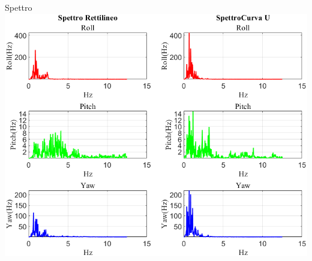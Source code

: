 \documentclass[beamer]{standalone}
\begin{document}
	\begin{frame}{{Spettro}}
		\centering\includegraphics[height=.8\textheight]{figure/VAng/Trasformata/Spettro}
	\end{frame}
	
\end{document}
